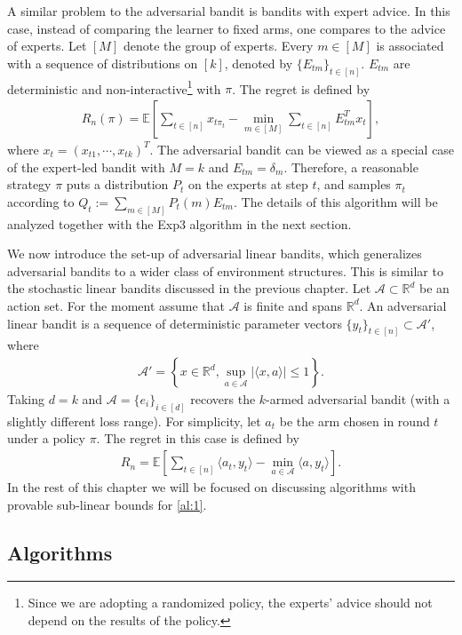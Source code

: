 \documentclass[10pt,a4article]{amsart}
\numberwithin{equation}{section}
\theoremstyle{plain}
\theoremstyle{definition}
\def\R{{\mathbb R}}
\def\E{{\mathbb E}}
\def\R{{\mathbb R}}
\begin{document}
A similar problem to the adversarial bandit is bandits with expert advice. In this case, instead of comparing the learner to fixed arms, one compares to the advice of experts. Let $[M]$ denote the group of experts. Every $m\in [M]$ is associated with a sequence of distributions on $[k]$, denoted by $\{E_{tm}\}_{t\in [n]}$. $E_{tm}$ are deterministic and non-interactive\footnote{Since we are adopting a randomized policy, the experts' advice should not depend on the results of the policy.} with $\pi$. The regret is defined by
\begin{align*}
R_n(\pi) = \E\left[\sum_{t\in [n]}x_{t\pi_t}-\min_{m\in [M]}\sum_{t\in [n]}E^T_{tm}x_{t}\right],
\end{align*}
where $x_t = (x_{t1}, \cdots, x_{tk})^T$. The adversarial bandit can be viewed as a special case of the expert-led bandit with $M=k$ and $E_{tm} = \delta_m$. Therefore, a reasonable strategy $\pi$ puts a distribution $P_t$ on the experts at step $t$, and samples $\pi_t$ according to $Q_t:=\sum_{m\in [M]}P_t(m)E_{tm}$. The details of this algorithm will be analyzed together with the Exp3 algorithm in the next section. 

We now introduce the set-up of adversarial linear bandits, which generalizes adversarial bandits to a wider class of environment structures. This is similar to the stochastic linear bandits discussed in the previous chapter. Let $\mathcal A\subset\R^d$ be an action set. For the moment assume that $\mathcal A$ is finite and spans $\R^d$.  An adversarial linear bandit is a sequence of deterministic parameter vectors $\{y_t\}_{t\in [n]}\subset\mathcal A'$, where  
\begin{align*}
\mathcal A' = \left\{x\in\R^d, \sup_{a\in\mathcal A}|\langle x, a\rangle|\leq 1\right\}. 
\end{align*}
Taking $d = k$ and $\mathcal A=\{e_i\}_{i\in [d]}$ recovers the $k$-armed adversarial bandit (with a slightly different loss range). For simplicity, let $a_t$ be the arm chosen in round $t$ under a policy $\pi$. The regret in this case is defined by 
\begin{align}
R_n = \E\left[\sum_{t\in [n]}\langle a_t, y_t\rangle-\min_{a\in\mathcal A}\langle a, y_t\rangle\right].\label{al:1}
\end{align}
In the rest of this chapter we will be focused on discussing algorithms with provable sub-linear bounds for \eqref{al:1}. 


\subsection{Algorithms}
\end{document}
